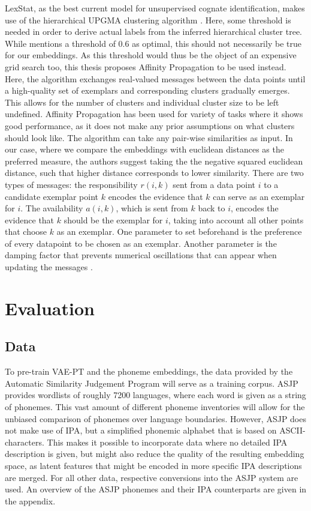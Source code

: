 \documentclass[6pt]{article}
\begin{document}
LexStat, as the best current model for unsupervised cognate identification, makes use of the hierarchical UPGMA clustering algorithm \citep{sokal1958statistical}. Here, some threshold is needed in order to derive actual labels from the inferred hierarchical cluster tree. While \cite{list2012lexstat} mentions a threshold of 0.6 as optimal, this should not necessarily be true for our embeddings. As this threshold would thus be the object of an expensive grid search too, this thesis proposes Affinity Propagation \citep{frey2007clustering} to be used instead. Here, the algorithm exchanges real-valued messages between the data points until a high-quality set of exemplars and corresponding clusters gradually emerges. This allows for the number of clusters and individual cluster size to be left undefined. Affinity Propagation has been used for variety of tasks where it shows good performance, as it does not make any prior assumptions on what clusters should look like. The algorithm can take any pair-wise similarities as input. In our case, where we compare the embeddings with euclidean distances as the preferred measure, the authors suggest taking the the negative squared euclidean distance, such that higher distance corresponds to  lower similarity. There are two types of messages: the responsibility $r(i,k)$ sent from a data point $i$ to a candidate exemplar point $k$ encodes the evidence that $k$ can serve as an exemplar for $i$. The availability $a(i,k)$, which is sent from $k$ back to $i$, encodes the evidence that $k$ should be the exemplar for $i$, taking into account all other points that choose $k$ as an exemplar. One parameter to set beforehand is the preference of every datapoint to be chosen as an exemplar. Another parameter is the damping factor that prevents numerical oscillations that can appear when updating the messages \citep[p. 972]{frey2007clustering}.


\section{Evaluation}
\label{Evaluation}
\subsection{Data}
To pre-train VAE-PT and the phoneme embeddings,  the data provided by the Automatic Similarity Judgement Program \citep[ASJP,][]{wichmann2010asjp} will serve as a training corpus. ASJP provides wordlists of roughly 7200 languages, where each word is given as a string of phonemes. This vast amount of different phoneme inventories will allow for the unbiased comparison of phonemes over language boundaries. However, ASJP does not make use of IPA, but a simplified phonemic alphabet that is based on ASCII-characters. This makes it possible to incorporate data where no detailed IPA description is given, but might also reduce the quality of the resulting embedding space, as latent features that might be encoded in more specific IPA descriptions are merged. For all other data, respective conversions into the ASJP system are used.  An overview of the ASJP phonemes and their IPA counterparts are given in the appendix.
\end{document}
